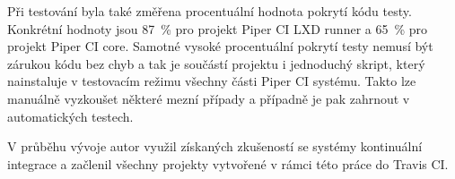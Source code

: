 Při testování byla také změřena procentuální hodnota pokrytí kódu testy.
Konkrétní hodnoty jsou 87~\% pro projekt Piper CI LXD runner a 65~\% pro projekt Piper CI core.
Samotné vysoké procentuální pokrytí testy nemusí být zárukou kódu bez chyb a tak je součástí projektu i jednoduchý skript, který nainstaluje v testovacím režimu všechny části Piper CI systému.
Takto lze manuálně vyzkoušet některé mezní případy a případně je pak zahrnout v automatických testech.

V průběhu vývoje autor využil získaných zkušeností se systémy kontinuální integrace a začlenil všechny projekty vytvořené v rámci této práce do Travis CI.

